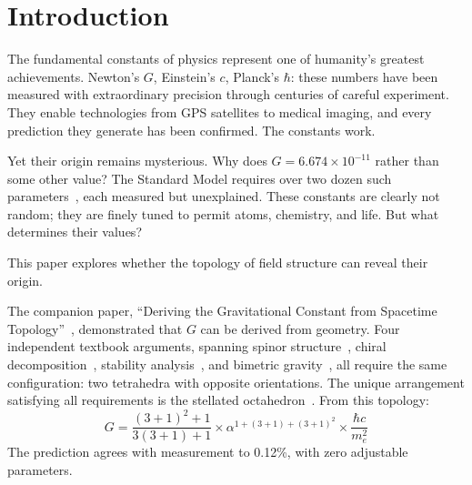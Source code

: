 \documentclass[aps,prd,preprint,superscriptaddress,showpacs,preprintnumbers,amsmath,amssymb,nofootinbib]{revtex4-2}
\begin{document}


\maketitle

\section{Introduction}
\label{sec:intro}

The fundamental constants of physics represent one of humanity's greatest achievements. Newton's $G$, Einstein's $c$, Planck's $\hbar$: these numbers have been measured with extraordinary precision through centuries of careful experiment. They enable technologies from GPS satellites to medical imaging, and every prediction they generate has been confirmed. The constants work.

Yet their origin remains mysterious. Why does $G = 6.674 \times 10^{-11}$ rather than some other value? The Standard Model requires over two dozen such parameters~\cite{pdg2024}, each measured but unexplained. These constants are clearly not random; they are finely tuned to permit atoms, chemistry, and life. But what determines their values?

This paper explores whether the topology of field structure can reveal their origin.

The companion paper, ``Deriving the Gravitational Constant from Spacetime Topology''~\cite{paper6}, demonstrated that $G$ can be derived from geometry. Four independent textbook arguments, spanning spinor structure~\cite{weinberg1995,geroch1968}, chiral decomposition~\cite{ashtekar1986}, stability analysis~\cite{alexander2014}, and bimetric gravity~\cite{hassan2012}, all require the same configuration: two tetrahedra with opposite orientations. The unique arrangement satisfying all requirements is the stellated octahedron~\cite{coxeter1973}. From this topology:
\begin{equation}
G = \frac{(3+1)^2 + 1}{3(3+1) + 1} \times \alpha^{1+(3+1)+(3+1)^2} \times \frac{\hbar c}{m_e^2}
\label{eq:G}
\end{equation}
The prediction agrees with measurement to 0.12\%, with zero adjustable parameters.
\end{document}
